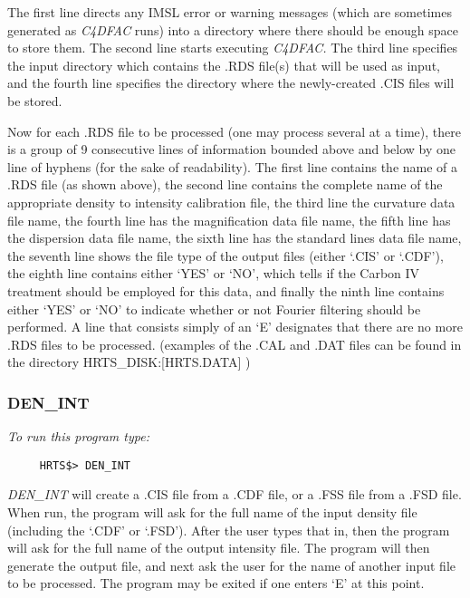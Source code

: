       The first line directs any IMSL error or warning messages (which are
   sometimes generated as {\em C4DFAC} runs) into a directory where there should
   be enough space to store them.  The second line starts executing {\em 
C4DFAC.}
   The third line specifies the input directory which contains the .RDS
   file(s) that will be used as input, and the fourth line specifies the
   directory where the newly-created .CIS files will be stored.

      Now for each .RDS file to be processed (one may process several at a
   time), there is a group of 9 consecutive lines of information bounded
   above and below by one line of hyphens (for the sake of readability).
   The first line contains the name of a .RDS file (as shown above), the second
   line contains the complete name of the appropriate density to intensity
   calibration file, the third line the curvature data file name, the fourth
   line has the magnification data file name, the fifth line has the
   dispersion data file name, the sixth line has the standard lines data
   file name, the seventh line shows the file type of the output files (either
  `.CIS' or `.CDF'), the eighth line contains either `YES' or `NO', which
   tells if the Carbon IV treatment should be employed for this data, and
   finally the ninth line contains either `YES' or `NO' to indicate whether
   or not Fourier filtering should be performed.  A line that consists
   simply of an `E' designates that there are no more .RDS files to be
   processed. (examples of the .CAL and .DAT files can be found in the 
   directory HRTS\_DISK:[HRTS.DATA] )

\subsubsection{DEN\_INT}

{\em To run this program type:}
\begin{verbatim}
     HRTS$> DEN_INT                        
\end{verbatim}   
{\em DEN\_INT} will create a .CIS file from a .CDF file, or a .FSS file
   from a .FSD file.  When run, the program will ask for the full name of
   the input density file (including the `.CDF' or `.FSD').  After the
   user types that in, then the program will ask for the full name of the
   output intensity file.  The program will then generate the output file,
   and next ask the user for the name of another input file to be
   processed.  The program may be exited if one enters `E' at this point.

